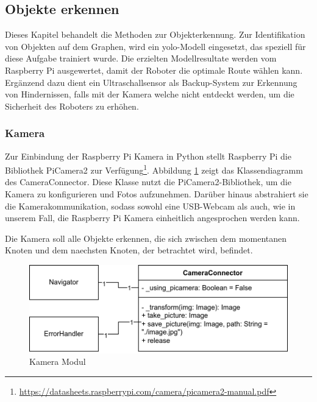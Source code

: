 
\subsection{Objekte erkennen}

Dieses Kapitel behandelt die Methoden zur Objekterkennung. Zur Identifikation von Objekten auf dem Graphen, wird ein \gls{yolo}-Modell eingesetzt, das speziell für diese Aufgabe trainiert wurde. Die erzielten Modellresultate werden vom Raspberry Pi ausgewertet, damit der Roboter die optimale Route wählen kann. Ergänzend dazu dient ein Ultraschallsensor als Backup-System zur Erkennung von Hindernissen, falls mit der Kamera welche nicht entdeckt werden, um die Sicherheit des Roboters zu erhöhen. 


\subsubsection{Kamera}
\label{camera-connector}

Zur Einbindung der Raspberry Pi Kamera in Python stellt Raspberry Pi die Bibliothek PiCamera2 zur Verfügung\footnote{\url{https://datasheets.raspberrypi.com/camera/picamera2-manual.pdf}}.
Abbildung \ref{fig:camera-connector-classdiagram} zeigt das Klassendiagramm des CameraConnector. Diese Klasse nutzt die PiCamera2-Bibliothek, um die Kamera zu konfigurieren und Fotos aufzunehmen. Darüber hinaus abstrahiert sie die Kamerakommunikation, sodass sowohl eine USB-Webcam als auch, wie in unserem Fall, die Raspberry Pi Kamera einheitlich angesprochen werden kann.

Die Kamera soll alle Objekte erkennen, die sich zwischen dem momentanen Knoten und dem naechsten Knoten, der betrachtet wird, befindet.

 \begin{figure}[H]
\centering
\includegraphics[width= \textwidth ]{assets/IT/robot-sw-architecture-camera-connector.png}
\caption{Kamera Modul}
\label{fig:camera-connector-classdiagram}
\end{figure}



